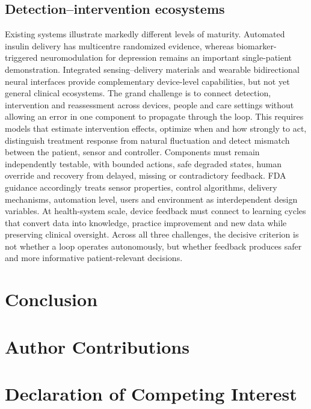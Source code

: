 \documentclass[12pt,a4paper]{article}
\newif\ifshowplaceholders
\newcommand{\outlineplaceholder}{%
\ifshowplaceholders
\par\noindent\textit{[Content to be developed.]}\par\medskip
\fi
}
\begin{document}
\subsection{Detection--intervention ecosystems}
\label{subsec:closed_loop_detection_intervention}
Existing systems illustrate markedly different levels of maturity. Automated insulin delivery has multicentre randomized evidence, whereas biomarker-triggered neuromodulation for depression remains an important single-patient demonstration. Integrated sensing--delivery materials and wearable bidirectional neural interfaces provide complementary device-level capabilities, but not yet general clinical ecosystems. The grand challenge is to connect detection, intervention and reassessment across devices, people and care settings without allowing an error in one component to propagate through the loop. This requires models that estimate intervention effects, optimize when and how strongly to act, distinguish treatment response from natural fluctuation and detect mismatch between the patient, sensor and controller. Components must remain independently testable, with bounded actions, safe degraded states, human override and recovery from delayed, missing or contradictory feedback. FDA guidance accordingly treats sensor properties, control algorithms, delivery mechanisms, automation level, users and environment as interdependent design variables. At health-system scale, device feedback must connect to learning cycles that convert data into knowledge, practice improvement and new data while preserving clinical oversight. Across all three challenges, the decisive criterion is not whether a loop operates autonomously, but whether feedback produces safer and more informative patient-relevant decisions.


\section{Conclusion}
\label{sec:conclusion}
\outlineplaceholder


\section*{Author Contributions}
\outlineplaceholder

\section*{Declaration of Competing Interest}
\outlineplaceholder
\end{document}
